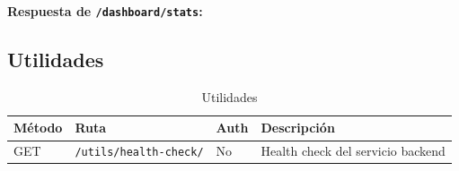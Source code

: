 \textbf{Respuesta de \texttt{/dashboard/stats}:}

\begin{Shaded}
\begin{Highlighting}[]
\FunctionTok{\{}
  \FunctionTok{:} \FunctionTok{\{} \FunctionTok{:} \FunctionTok{,} \FunctionTok{:}  \FunctionTok{\},}
  \FunctionTok{:} \FunctionTok{\{} \FunctionTok{:} \FunctionTok{,} \FunctionTok{:}  \FunctionTok{\},}
  \FunctionTok{:} \FunctionTok{,}
  \FunctionTok{:} \FunctionTok{,}
  \FunctionTok{:} \OtherTok{[}
    \FunctionTok{\{}
      \FunctionTok{:} \FunctionTok{,}
      \FunctionTok{:} \FunctionTok{,}
      \FunctionTok{:} \FunctionTok{,}
      \FunctionTok{:} 
    \FunctionTok{\}}
  \OtherTok{]}\FunctionTok{,}
  \FunctionTok{:} \OtherTok{[}\FunctionTok{\{} \FunctionTok{:} \FunctionTok{,} \FunctionTok{:} \FunctionTok{,} \FunctionTok{:}  \FunctionTok{\}}\OtherTok{]}
\FunctionTok{\}}
\end{Highlighting}
\end{Shaded}

\subsection{Utilidades}\label{utilidades}

\begin{longtable}[]{@{}
  >{\raggedright\arraybackslash}p{}
  >{\raggedright\arraybackslash}p{}
  >{\raggedright\arraybackslash}p{}
  >{\raggedright\arraybackslash}p{}@{}}
\caption[Utilidades]{Utilidades}\tabularnewline
\toprule\noalign{}
\begin{minipage}[b]{\linewidth}\raggedright
Método
\end{minipage} & \begin{minipage}[b]{\linewidth}\raggedright
Ruta
\end{minipage} & \begin{minipage}[b]{\linewidth}\raggedright
Auth
\end{minipage} & \begin{minipage}[b]{\linewidth}\raggedright
Descripción
\end{minipage} \\
\midrule\noalign{}
\endhead
\bottomrule\noalign{}
\endlastfoot
GET & \texttt{/utils/health-check/} & No & Health check del servicio backend \\
\end{longtable}

